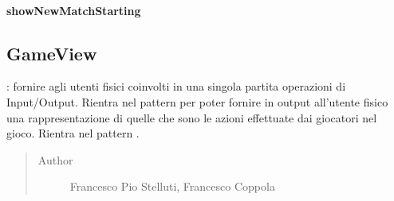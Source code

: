 \documentclass[letterpaper,10pt,italian,openany,oneside]{sphinxmanual}
\begin{document}
\begin{fulllineitems}
\label{\detokenize{source/it/unicam/cs/pa/mastermind/ui/ConsoleStartView:it.unicam.cs.pa.mastermind.ui.ConsoleStartView.showLogo()}}
\end{fulllineitems}



\paragraph{showNewMatchStarting}
\label{\detokenize{source/it/unicam/cs/pa/mastermind/ui/ConsoleStartView:shownewmatchstarting}}

\begin{fulllineitems}
\label{\detokenize{source/it/unicam/cs/pa/mastermind/ui/ConsoleStartView:it.unicam.cs.pa.mastermind.ui.ConsoleStartView.showNewMatchStarting()}}
\end{fulllineitems}



\subsection{GameView}
\label{\detokenize{source/it/unicam/cs/pa/mastermind/ui/GameView:gameview}}\label{\detokenize{source/it/unicam/cs/pa/mastermind/ui/GameView::doc}}

\begin{fulllineitems}
\label{\detokenize{source/it/unicam/cs/pa/mastermind/ui/GameView:it.unicam.cs.pa.mastermind.ui.GameView}}
: fornire agli utenti fisici coinvolti in una singola partita operazioni di Input/Output. Rientra nel pattern  per poter fornire in output all’utente fisico una rappresentazione di quelle che sono le azioni effettuate dai giocatori nel gioco. Rientra nel pattern .
\begin{quote}\begin{description}
\item[{Author}] \leavevmode
Francesco Pio Stelluti, Francesco Coppola

\end{description}\end{quote}

\end{fulllineitems}
\end{document}
